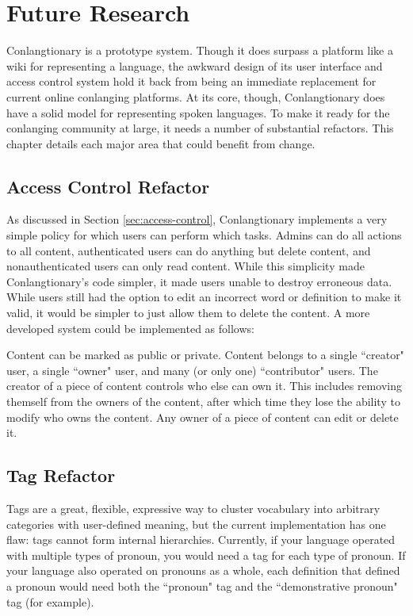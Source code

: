 \chapter{Future Research}
\label{chap:future}

Conlangtionary is a prototype system. Though it does surpass a platform like a wiki for representing a language, the awkward design of its user interface and access control system hold it back from being an immediate replacement for current online conlanging platforms. At its core, though, Conlangtionary does have a solid model for representing spoken languages. To make it ready for the conlanging community at large, it needs a number of substantial refactors. This chapter details each major area that could benefit from change.

\section{Access Control Refactor}
\label{sec:refactor-access}

As discussed in Section \ref{sec:access-control}, Conlangtionary implements a very simple policy for which users can perform which tasks. Admins can do all actions to all content, authenticated users can do anything but delete content, and nonauthenticated users can only read content. While this simplicity made Conlangtionary's code simpler, it made users unable to destroy erroneous data. While users still had the option to edit an incorrect word or definition to make it valid, it would be simpler to just allow them to delete the content. A more developed system could be implemented as follows:

Content can be marked as public or private. Content belongs to a single ``creator" user, a single ``owner" user, and many (or only one) ``contributor" users. The creator of a piece of content controls who else can own it. This includes removing themself from the owners of the content, after which time they lose the ability to modify who owns the content. Any owner of a piece of content can edit or delete it.

\section{Tag Refactor}
\label{sec:refactor-tag}

Tags are a great, flexible, expressive way to cluster vocabulary into arbitrary categories with user-defined meaning, but the current implementation has one flaw: tags cannot form internal hierarchies. Currently, if your language operated with multiple types of pronoun, you would need a tag for each type of pronoun. If your language also operated on pronouns as a whole, each definition that defined a pronoun would need both the ``pronoun" tag and the ``demonstrative pronoun" tag (for example). 

